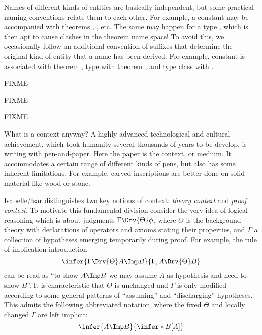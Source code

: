 \begin{isabellebody}
\begin{isamarkuptext}
Names of different kinds of entities are basically independent, but
some practical naming conventions relate them to each other.  For
example, a constant  may be accompanied with theorems
, ,  etc.  The
same may happen for a type , which is then apt to cause
clashes in the theorem name space!  To avoid this, we occasionally
follow an additional convention of suffixes that determine the
original kind of entity that a name has been derived.  For example,
constant  is associated with theorem ,
type  with theorem , and type
class  with .%
\end{isamarkuptext}%
\isamarkuptrue%
%
\endisatagFIXME
{\isafoldFIXME}%
%
\isadelimFIXME
%
\endisadelimFIXME
%
\isamarkuptrue%
%
\isamarkuptrue%
%
\begin{isamarkuptext}%
FIXME%
\end{isamarkuptext}%
\isamarkuptrue%
%
\isamarkuptrue%
%
\begin{isamarkuptext}%
FIXME%
\end{isamarkuptext}%
\isamarkuptrue%
%
\isamarkuptrue%
%
\begin{isamarkuptext}%
FIXME%
\end{isamarkuptext}%
\isamarkuptrue%
%
\isamarkuptrue%
%
\isadelimFIXME
%
\endisadelimFIXME
%
\isatagFIXME
%
\begin{isamarkuptext}%
What is a context anyway?  A highly advanced
technological and cultural achievement, which took humanity several
thousands of years to be develop, is writing with pen-and-paper.  Here
the paper is the context, or medium.  It accommodates a certain range
of different kinds of pens, but also has some inherent limitations.
For example, carved inscriptions are better done on solid material
like wood or stone.

Isabelle/Isar distinguishes two key notions of context: \emph{theory
  context} and \emph{proof context}. To motivate this fundamental division consider the very idea of
logical reasoning which is about judgments $\Gamma \Drv{\Theta} \phi$, where
$\Theta$ is the background theory with declarations of operators and axioms
stating their properties, and $\Gamma$ a collection of hypotheses emerging
temporarily during proof.  For example, the rule of implication-introduction
\[
\infer{\Gamma \Drv{\Theta} A \Imp B}{\Gamma, A \Drv{\Theta} B}
\]
can be read as ``to show $A \Imp B$ we may assume $A$ as hypothesis and need
to show $B$''.  It is characteristic that $\Theta$ is unchanged and $\Gamma$
is only modified according to some general patterns of ``assuming'' and
``discharging'' hypotheses.  This admits the following abbreviated notation,
where the fixed $\Theta$ and locally changed $\Gamma$ are left implicit:
\[
\infer{A \Imp B}{\infer*{B}{[A]}}
\]


\end{isamarkuptext}
\end{isabellebody}
